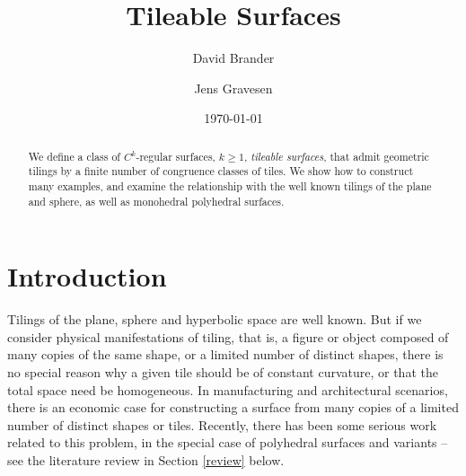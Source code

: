 \documentclass[11pt]{amsart}
\theoremstyle{remark}
\newcounter{case}
\begin{document}
\title{Tileable Surfaces}
\author{David Brander}
\address{Department of Applied Mathematics and Computer Science,\\
Technical University of Denmark\\
 Matematiktorvet, Building 303 B\\
DK-2800 Kgs. Lyngby\\ Denmark}

\author{Jens Gravesen}
\address{Department of Applied Mathematics and Computer Science,\\
Technical University of Denmark\\
 Matematiktorvet, Building 303 B\\
DK-2800 Kgs. Lyngby\\ Denmark}
\date{\today}				%

\begin{abstract}
We define a class of $C^k$-regular surfaces, $k \geq 1$, \emph{tileable surfaces}, that admit geometric tilings by a finite number of congruence classes of tiles.   We show how to construct many examples,  and examine the relationship with the well known tilings of the plane and sphere, as well as monohedral polyhedral surfaces.


\end{abstract}


\maketitle












\section{Introduction}
Tilings of the plane, sphere and hyperbolic space are well known.
But if we consider physical manifestations of tiling, that is, a figure or object composed of many copies of the same shape, or a limited number of distinct shapes, there is no special reason why a given tile should be of constant curvature, or that the total space need be homogeneous.  In manufacturing and architectural scenarios, there is  an economic case for constructing a surface from many copies of a limited number of distinct shapes or tiles.  Recently, there has been some serious work related to this problem, in the special case of polyhedral surfaces and variants -- see the literature review in Section \ref{review} below.
\end{document}
